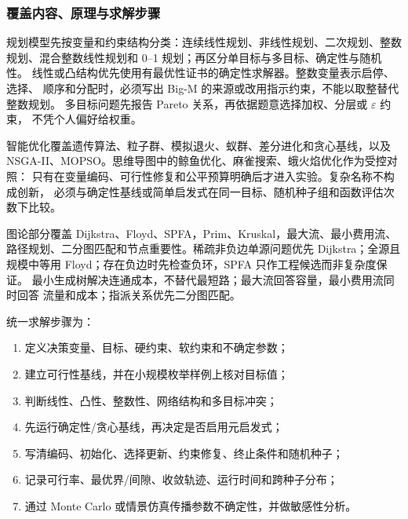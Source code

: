 \subsubsection{覆盖内容、原理与求解步骤}

规划模型先按变量和约束结构分类：连续线性规划、非线性规划、二次规划、整数
规划、混合整数线性规划和 0--1 规划；再区分单目标与多目标、确定性与随机性。
线性或凸结构优先使用有最优性证书的确定性求解器。整数变量表示启停、选择、
顺序和分配时，必须写出 Big-M 的来源或改用指示约束，不能以取整替代整数规划。
多目标问题先报告 Pareto 关系，再依据题意选择加权、分层或 $\varepsilon$ 约束，
不凭个人偏好给权重。

智能优化覆盖遗传算法、粒子群、模拟退火、蚁群、差分进化和贪心基线，以及
NSGA-II、MOPSO。思维导图中的鲸鱼优化、麻雀搜索、蛾火焰优化作为受控对照：
只有在变量编码、可行性修复和公平预算明确后才进入实验。复杂名称不构成创新，
必须与确定性基线或简单启发式在同一目标、随机种子组和函数评估次数下比较。

图论部分覆盖 Dijkstra、Floyd、SPFA，Prim、Kruskal，最大流、最小费用流、
路径规划、二分图匹配和节点重要性。稀疏非负边单源问题优先 Dijkstra；全源且
规模中等用 Floyd；存在负边时先检查负环，SPFA 只作工程候选而非复杂度保证。
最小生成树解决连通成本，不替代最短路；最大流回答容量，最小费用流同时回答
流量和成本；指派关系优先二分图匹配。

统一求解步骤为：
\begin{enumerate}
  \item 定义决策变量、目标、硬约束、软约束和不确定参数；
  \item 建立可行性基线，并在小规模枚举样例上核对目标值；
  \item 判断线性、凸性、整数性、网络结构和多目标冲突；
  \item 先运行确定性/贪心基线，再决定是否启用元启发式；
  \item 写清编码、初始化、选择更新、约束修复、终止条件和随机种子；
  \item 记录可行率、最优界/间隙、收敛轨迹、运行时间和跨种子分布；
  \item 通过 Monte Carlo 或情景仿真传播参数不确定性，并做敏感性分析。
\end{enumerate}

